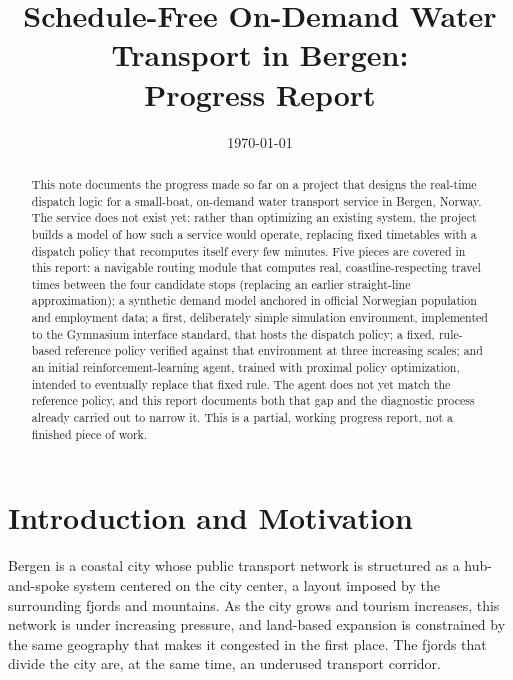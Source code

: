 \documentclass[11pt,a4paper]{article}
\title{Schedule-Free On-Demand Water Transport in Bergen:\\ Progress Report}
\author{}
\date{\today}
\begin{document}
\maketitle

\begin{abstract}
\noindent
This note documents the progress made so far on a project that designs the real-time dispatch logic for a small-boat, on-demand water transport service in Bergen, Norway. The service does not exist yet: rather than optimizing an existing system, the project builds a model of how such a service would operate, replacing fixed timetables with a dispatch policy that recomputes itself every few minutes. Five pieces are covered in this report: a navigable routing module that computes real, coastline-respecting travel times between the four candidate stops (replacing an earlier straight-line approximation); a synthetic demand model anchored in official Norwegian population and employment data; a first, deliberately simple simulation environment, implemented to the Gymnasium interface standard, that hosts the dispatch policy; a fixed, rule-based reference policy verified against that environment at three increasing scales; and an initial reinforcement-learning agent, trained with proximal policy optimization, intended to eventually replace that fixed rule. The agent does not yet match the reference policy, and this report documents both that gap and the diagnostic process already carried out to narrow it. This is a partial, working progress report, not a finished piece of work.
\end{abstract}

\tableofcontents
\newpage

\section{Introduction and Motivation}

Bergen is a coastal city whose public transport network is structured as a hub-and-spoke system centered on the city center, a layout imposed by the surrounding fjords and mountains. As the city grows and tourism increases, this network is under increasing pressure, and land-based expansion is constrained by the same geography that makes it congested in the first place. The fjords that divide the city are, at the same time, an underused transport corridor.
\end{document}
